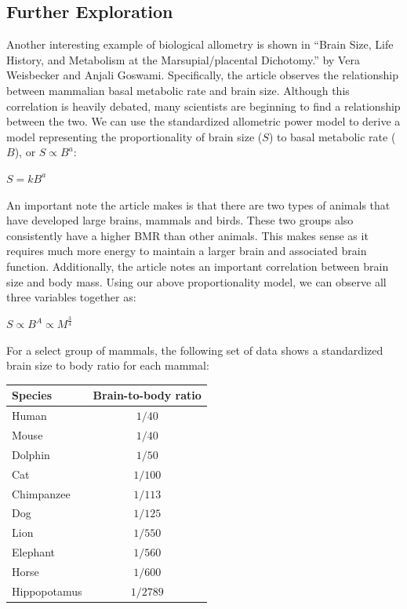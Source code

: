 \documentclass[10pt,letterpaper]{article}
\begin{document}
		\subsection{Further Exploration}
			Another interesting example of biological allometry is shown in “Brain Size, Life History, and Metabolism at the Marsupial/placental Dichotomy.” by Vera Weisbecker and Anjali Goswami. Specifically, the article observes the relationship between mammalian basal metabolic rate and brain size. Although this correlation is heavily debated, many scientists are beginning to find a relationship between the two. We can use the standardized allometric power model to derive a model representing the proportionality of brain size ($S$) to basal metabolic rate ($B$), or $S \propto B^{a}$:
			\newline
			\centerline{$S = kB^{a}$}
			\newline
			An important note the article makes is that there are two types of animals that have developed large brains, mammals and birds. These two groups also consistently have a higher BMR than other animals. This makes sense as it requires much more energy to maintain a larger brain and associated brain function. 
			\newline \newline
			Additionally, the article notes an important correlation between brain size and body mass. Using our above proportionality model, we can observe all three variables together as:
			\newline
			\centerline{$S \propto B^{A} \propto M^{\frac 3 4}$}
			\newline
			For a select group of mammals, the following set of data shows a standardized brain size to body ratio for each mammal:
			\begin{center}
				\begin{tabular}{l c}
					Species & Brain-to-body ratio \\
					\hline 
					Human & $1/40$ \\
					Mouse & $1/40$ \\
					Dolphin & $1/50$ \\
					Cat & $1/100$ \\
					Chimpanzee & $1/113$ \\
					Dog & $1/125$ \\
					Lion & $1/550$ \\
					Elephant & $1/560$ \\
					Horse & $1/600$ \\
					Hippopotamus & $1/2789$
				\end{tabular}
			\end{center}
\end{document}
